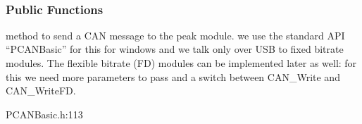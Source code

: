 \documentclass[a4paper,10pt,english]{sphinxmanual}
\begin{document}
\begin{fulllineitems}
\label{\detokenize{classestracing:_CPPv49PKCanScan}}%
\pysigstartmultiline
{}%
\pysigstopmultiline~\subsubsection*{Public Functions}

\begin{fulllineitems}
\label{\detokenize{classestracing:_CPPv4N9PKCanScan11sendMessageEshPhb}}%
\pysigstartmultiline
{}%
\pysigstopmultiline
method to send a CAN message to the peak module. we use the standard API “PCAN\sphinxhyphen{}Basic” for this for windows and we talk only over USB to fixed bitrate modules. The flexible bitrate (FD) modules can be implemented later as well: for this we need more parameters to pass and a switch between CAN\_Write and CAN\_WriteFD. 

\end{fulllineitems}


\begin{fulllineitems}
\label{\detokenize{classestracing:_CPPv4N9PKCanScan13getPortStatusEv}}%
\pysigstartmultiline
{}%
\pysigstopmultiline
PCANBasic.h:113 

\end{fulllineitems}


\end{fulllineitems}

\end{document}
